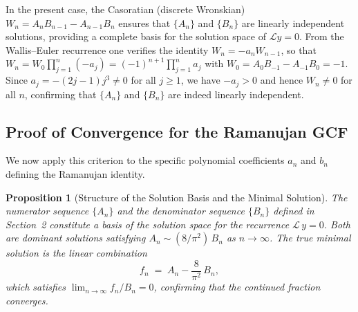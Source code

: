 \documentclass[pdflatex,sn-mathphys-num]{sn-jnl}
\theoremstyle{thmstyleone}
\newtheorem{proposition}[theorem]{Proposition}
\theoremstyle{thmstyletwo}
\theoremstyle{thmstylethree}
\begin{document}
	In the present case, the Casoratian (discrete Wronskian) $W_n = A_n B_{n-1} - A_{n-1} B_n$ ensures that $\{A_n\}$ and $\{B_n\}$ are linearly independent solutions, providing a complete basis for the solution space of $\mathcal{L}y=0$. From the Wallis--Euler recurrence one verifies the identity $W_n = -a_n W_{n-1}$, so that $W_n = W_0 \prod_{j=1}^n (-a_j) = (-1)^{n+1}\prod_{j=1}^n a_j$ with $W_0 = A_0 B_{-1} - A_{-1} B_0 = -1$. Since $a_j = -(2j-1)j^3 \neq 0$ for all $j \ge 1$, we have $-a_j > 0$ and hence $W_n \ne 0$ for all $n$, confirming that $\{A_n\}$ and $\{B_n\}$ are indeed linearly independent.
	
	\subsection{Proof of Convergence for the Ramanujan GCF}
	
	We now apply this criterion to the specific polynomial coefficients $a_n$ and $b_n$ defining the Ramanujan identity.
	
	\begin{proposition}[Structure of the Solution Basis and the Minimal Solution]\label{prop:minimal}
		The numerator sequence $\{A_n\}$ and the denominator sequence $\{B_n\}$ defined in Section~2 constitute a basis of the solution space for the recurrence $\mathcal{L}\,y = 0$.  Both are dominant solutions satisfying $A_n \sim (8/\pi^2)\,B_n$ as $n\to\infty$.  The true minimal solution is the linear combination
		\begin{equation}\label{eq:minimal_def}
			f_n \;=\; A_n - \frac{8}{\pi^2}\,B_n,
		\end{equation}
		which satisfies $\lim_{n\to\infty} f_n/B_n = 0$, confirming that the continued fraction converges.
	\end{proposition}
	
\end{document}
